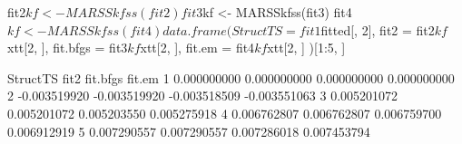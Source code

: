 \begin{Schunk}
\begin{Sinput}
 fit2$kf <- MARSSkfss(fit2)
 fit3$kf <- MARSSkfss(fit3)
 fit4$kf <- MARSSkfss(fit4)
 data.frame(
   StructTS = fit1$fitted[, 2], fit2 = fit2$kf$xtt[2, ],
   fit.bfgs = fit3$kf$xtt[2, ], fit.em = fit4$kf$xtt[2, ]
 )[1:5, ]
\end{Sinput}
\begin{Soutput}
      StructTS         fit2     fit.bfgs       fit.em
1  0.000000000  0.000000000  0.000000000  0.000000000
2 -0.003519920 -0.003519920 -0.003518509 -0.003551063
3  0.005201072  0.005201072  0.005203550  0.005275918
4  0.006762807  0.006762807  0.006759700  0.006912919
5  0.007290557  0.007290557  0.007286018  0.007453794
\end{Soutput}
\end{Schunk}
